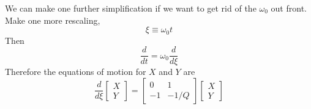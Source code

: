 We can make one further simplification if we want to get rid of the $\omega_0$ out front.
Make one more rescaling,\begin{equation}
\xi\equiv\omega_{0}t \end{equation}
Then \begin{equation}
\frac{d}{dt}=\omega_{0}\frac{d}{d\xi}\end{equation}
Therefore the equations of motion for $X$ and $Y$ are \begin{equation}
\frac{d}{d\xi}\left[\begin{array}{c} X\\ Y\end{array}\right] = 
\left[\begin{array}{cc} 0 & 1\\ -1 & -1/Q \end{array}\right]
\left[\begin{array}{c} X\\ Y\end{array}\right]\end{equation}

